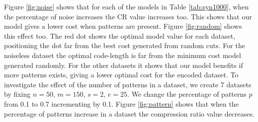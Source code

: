 Figure \ref{fig:noise} shows that for each of the models in Table \ref{tab:syn1000}, when the percentage of noise increases the CR value increases too. This shows that our model gives a lower cost when patterns are present. Figure \ref{fig:random} shows this effect too. The red dot shows the optimal model value for each dataset, positioning the dot far from the best cost generated from random cuts. For the noiseless dataset the optimal code-length is far from the minimum cost model generated randomly. For the other datasets it shows that our model benefits if more patterns exists, giving a lower optimal cost for the encoded dataset. To investigate the effect of the number of patterns in a dataset, we create 7 datasets by fixing $n=50$, $m=150$, $s=2$, $e=25$. We change the percentage of patterns $p$ from 0.1 to 0.7 incrementing by 0.1. Figure \ref{fig:pattern} shows that when the percentage of patterns increase in a dataset the compression ratio value decreases.

